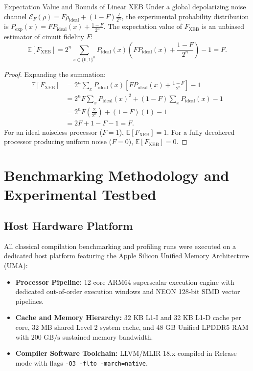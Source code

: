 \begin{theorembox}{Expectation Value and Bounds of Linear XEB}
Under a global depolarizing noise channel $\mathcal{E}_F(\rho) = F \rho_{\text{ideal}} + (1 - F) \frac{I}{2^n}$, the experimental probability distribution is $P_{\text{exp}}(x) = F P_{\text{ideal}}(x) + \frac{1 - F}{2^n}$. The expectation value of $F_{\text{XEB}}$ is an unbiased estimator of circuit fidelity $F$:
\begin{equation}
    \mathbb{E}[F_{\text{XEB}}] = 2^n \sum_{x \in \{0, 1\}^n} P_{\text{ideal}}(x) \left( F P_{\text{ideal}}(x) + \frac{1 - F}{2^n} \right) - 1 = F.
\end{equation}
\end{theorembox}

\begin{proof}
Expanding the summation:
\begin{align}
    \mathbb{E}[F_{\text{XEB}}] &= 2^n \sum_{x} P_{\text{ideal}}(x) \left[ F P_{\text{ideal}}(x) + \frac{1 - F}{2^n} \right] - 1 \\
    &= 2^n F \sum_{x} P_{\text{ideal}}(x)^2 + (1 - F) \sum_{x} P_{\text{ideal}}(x) - 1 \\
    &= 2^n F \left( \frac{2}{2^n} \right) + (1 - F)(1) - 1 \\
    &= 2F + 1 - F - 1 = F.
\end{align}
For an ideal noiseless processor ($F=1$), $\mathbb{E}[F_{\text{XEB}}] = 1$. For a fully decohered processor producing uniform noise ($F=0$), $\mathbb{E}[F_{\text{XEB}}] = 0$.
\end{proof}

\section{Benchmarking Methodology and Experimental Testbed}
\label{sec:benchmark_methodology}

\subsection{Host Hardware Platform}
All classical compilation benchmarking and profiling runs were executed on a dedicated host platform featuring the Apple Silicon Unified Memory Architecture (UMA):
\begin{itemize}
    \item \textbf{Processor Pipeline:} 12-core ARM64 superscalar execution engine with dedicated out-of-order execution windows and NEON 128-bit SIMD vector pipelines.
    \item \textbf{Cache and Memory Hierarchy:} 32 KB L1-I and 32 KB L1-D cache per core, 32 MB shared Level 2 system cache, and 48 GB Unified LPDDR5 RAM with $200\text{ GB/s}$ sustained memory bandwidth.
    \item \textbf{Compiler Software Toolchain:} LLVM/MLIR 18.x compiled in Release mode with flags \texttt{-O3 -flto -march=native}.
\end{itemize}

